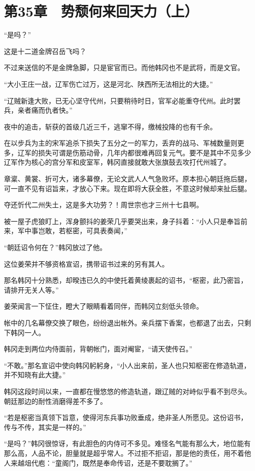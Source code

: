 \section{第35章　势颓何来回天力（上）}

“是吗？”

这是十二道金牌召岳飞吗？

不过来送信的不是金牌急脚，只是宦官而已。而他韩冈也不是武将，而是文官。

“大小王庄一战，辽军伤亡过万，这是河北、陕西所无法相比的大捷。”

“辽贼新逢大败，已无心坚守代州，只要稍待时日，官军必能重夺代州。此时罢兵，亲者痛而仇者快。”

夜中的追击，斩获的首级几近三千，逃窜不得，缴械投降的也有千余。

在以步兵为主的宋军追杀下损失了五分之一的军力，丢弃的战马、军械数量则更多，辽军的损失可谓是伤筋动骨，几年内都很难再回复元气。要不是其中不见多少辽军作为核心的宫分军和皮室军，韩冈直接就敢大张旗鼓去攻打代州城了。

章楶、黄裳、折可大，诸多幕僚，无论文武人人气急败坏。原本担心朝廷拖后腿，可一直不见有诏旨来，才放心下来。现在即将大获全胜，不意这时候却来扯后腿。

夺还忻代二州失土，这是多大功劳？！周世宗也才三州十七县啊。

被一屋子虎狼盯上，浑身颤抖的姜荣几乎要哭出来，身子抖着：“小人只是奉旨前来，军中事岂敢，若枢密，可具表奏闻，”

“朝廷诏令何在？”韩冈放过了他。

这位姜荣并不够资格宣诏，携带诏书过来的另有其人。

那名韩冈十分熟悉，却暌违已久的中使托着黄绫裹起的诏书，“枢密，此乃密旨，请排开无关人等。”

姜荣闻言一下怔住，瞪大了眼睛看着同伴，而韩冈立刻低头领命。

帐中的几名幕僚交换了眼色，纷纷退出帐外。亲兵摆下香案，也都退了出去，只剩下韩冈一人。

韩冈走到两位内侍面前，背朝帐门，面对阉宦，“请天使传召。”

“不敢。”那名宣诏中使向韩冈躬躬身，“小人出来前，圣人也只知枢密在修造轨道，并不知晓有此大捷。”

韩冈这段时间以来，一直都在慢悠悠的修造轨道，跟辽贼的对峙似乎看不到尽头。朝廷那边的耐性消磨得差不多了。

“若是枢密当真领下旨意，使得河东兵事功败垂成，绝非圣人所愿见。这份诏书，传与不传，其实是一样的。”

“是吗？”韩冈很惊讶，有此胆色的内侍可不多见。难怪名气能有那么大，地位能有那么高，人品不论，胆量就是超乎常人。不过拒不拒诏，那是他的责任，用不着他人来越俎代庖：“童阁门，既然是奉命传诏，还是不要耽搁了。”

